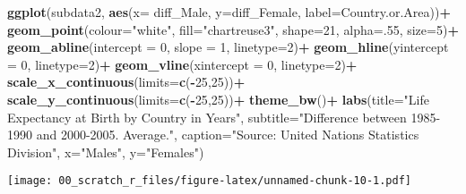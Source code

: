 \documentclass[]{article}
\newenvironment{Shaded}{\begin{snugshade}}{\end{snugshade}}
\newcommand{\DataTypeTok}[1]{\textcolor[rgb]{0.13,0.29,0.53}{#1}}
\newcommand{\DecValTok}[1]{\textcolor[rgb]{0.00,0.00,0.81}{#1}}
\newcommand{\KeywordTok}[1]{\textcolor[rgb]{0.13,0.29,0.53}{\textbf{#1}}}
\newcommand{\NormalTok}[1]{#1}
\newcommand{\OperatorTok}[1]{\textcolor[rgb]{0.81,0.36,0.00}{\textbf{#1}}}
\newcommand{\StringTok}[1]{\textcolor[rgb]{0.31,0.60,0.02}{#1}}
\begin{document}
\begin{Shaded}
\begin{Highlighting}[]
\KeywordTok{ggplot}\NormalTok{(subdata2, }\KeywordTok{aes}\NormalTok{(}\DataTypeTok{x=}\NormalTok{ diff_Male, }\DataTypeTok{y=}\NormalTok{diff_Female, }\DataTypeTok{label=}\NormalTok{Country.or.Area))}\OperatorTok{+}
\StringTok{  }\KeywordTok{geom_point}\NormalTok{(}\DataTypeTok{colour=}\StringTok{"white"}\NormalTok{, }\DataTypeTok{fill=}\StringTok{"chartreuse3"}\NormalTok{, }\DataTypeTok{shape=}\DecValTok{21}\NormalTok{, }\DataTypeTok{alpha=}\NormalTok{.}\DecValTok{55}\NormalTok{, }\DataTypeTok{size=}\DecValTok{5}\NormalTok{)}\OperatorTok{+}
\StringTok{  }\KeywordTok{geom_abline}\NormalTok{(}\DataTypeTok{intercept =} \DecValTok{0}\NormalTok{, }\DataTypeTok{slope =} \DecValTok{1}\NormalTok{, }\DataTypeTok{linetype=}\DecValTok{2}\NormalTok{)}\OperatorTok{+}\StringTok{ }
\StringTok{  }\KeywordTok{geom_hline}\NormalTok{(}\DataTypeTok{yintercept =} \DecValTok{0}\NormalTok{, }\DataTypeTok{linetype=}\DecValTok{2}\NormalTok{)}\OperatorTok{+}
\StringTok{  }\KeywordTok{geom_vline}\NormalTok{(}\DataTypeTok{xintercept =} \DecValTok{0}\NormalTok{, }\DataTypeTok{linetype=}\DecValTok{2}\NormalTok{)}\OperatorTok{+}
\StringTok{  }\KeywordTok{scale_x_continuous}\NormalTok{(}\DataTypeTok{limits=}\KeywordTok{c}\NormalTok{(}\OperatorTok{-}\DecValTok{25}\NormalTok{,}\DecValTok{25}\NormalTok{))}\OperatorTok{+}
\StringTok{  }\KeywordTok{scale_y_continuous}\NormalTok{(}\DataTypeTok{limits=}\KeywordTok{c}\NormalTok{(}\OperatorTok{-}\DecValTok{25}\NormalTok{,}\DecValTok{25}\NormalTok{))}\OperatorTok{+}
\StringTok{  }\KeywordTok{theme_bw}\NormalTok{()}\OperatorTok{+}
\StringTok{  }\KeywordTok{labs}\NormalTok{(}\DataTypeTok{title=}\StringTok{"Life Expectancy at Birth by Country in Years"}\NormalTok{,}
       \DataTypeTok{subtitle=}\StringTok{"Difference between 1985-1990 and 2000-2005. Average."}\NormalTok{,}
       \DataTypeTok{caption=}\StringTok{"Source: United Nations Statistics Division"}\NormalTok{,}
       \DataTypeTok{x=}\StringTok{"Males"}\NormalTok{,}
       \DataTypeTok{y=}\StringTok{"Females"}\NormalTok{)}
\end{Highlighting}
\end{Shaded}

\texttt{[image: 00\_scratch\_r\_files/figure-latex/unnamed-chunk-10-1.pdf]}
\end{document}
